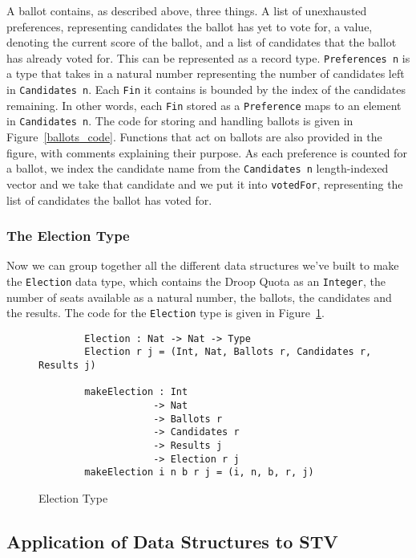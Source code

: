 A ballot contains, as described above, three things. A list of unexhausted
preferences, representing candidates the ballot has yet to vote for, a value,
denoting the current score of the ballot, and a list of candidates that the
ballot has already voted for. This can be represented as a record type.
\texttt{Preferences n} is a type that takes in a natural number representing the
number of candidates left in \texttt{Candidates n}. Each \texttt{Fin} it
contains is bounded by the index of the candidates remaining. In other words,
each \texttt{Fin} stored as a \texttt{Preference} maps to an element in
\texttt{Candidates n}. The code for storing and handling ballots is given in
Figure~\ref{ballots_code}. Functions that act on ballots are also provided in
the figure, with comments explaining their purpose. As each preference is counted
for a ballot, we index the candidate name from the \texttt{Candidates n}
length-indexed vector and we take that candidate and we put it into
\texttt{votedFor}, representing the list of candidates the ballot has voted for.


\subsubsection{The Election Type}

Now we can group together all the different data structures we've built to make
the \texttt{Election} data type, which contains the Droop Quota as an
\texttt{Integer}, the number of seats available as a natural number, the
ballots, the candidates and the results. The code for the \texttt{Election} type
is given in Figure~\ref{election_type_code}. 

\begin{figure}[ht!!!!!!!!!!!!!!]
	\caption{Election Type}
	\label{election_type_code}
	\begin{lstlisting}
        Election : Nat -> Nat -> Type
        Election r j = (Int, Nat, Ballots r, Candidates r, Results j)

        makeElection : Int 
                    -> Nat 
                    -> Ballots r
                    -> Candidates r 
                    -> Results j 
                    -> Election r j
        makeElection i n b r j = (i, n, b, r, j)
    \end{lstlisting}
\end{figure}

\newpage

\subsection{Application of Data Structures to STV}

